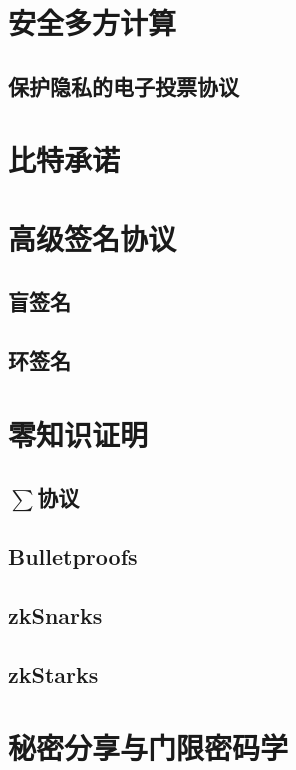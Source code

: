 \documentclass[UTF8]{ctexart}
\begin{document}
\section{安全多方计算}

\subsection{保护隐私的电子投票协议}

\section{比特承诺}

\section{高级签名协议}

\subsection{盲签名}

\subsection{环签名}

\section{零知识证明}

\subsection{$\sum$协议}

\subsection{Bulletproofs}

\subsection{zkSnarks}

\subsection{zkStarks}

\section{秘密分享与门限密码学}
\end{document}
